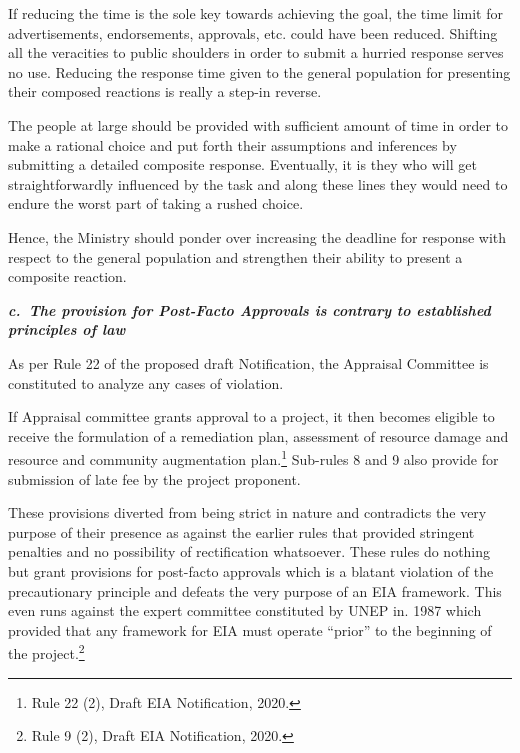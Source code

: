 \begin{multicols}{2}
\vspace{-.05cm}

\noi
If reducing the time is the sole key towards achieving the goal, the time limit for
advertisements, endorsements, approvals, etc. could have been reduced. Shifting all the
veracities to public shoulders in order to submit a hurried response serves no use.
Reducing the response time given to the general population for presenting their composed
reactions is really a step-in reverse. 

\vspace{-.05cm}

\noi
The people at large should be provided with sufficient amount of time in order to make a
rational choice and put forth their assumptions and inferences by submitting a detailed
composite response. Eventually, it is they who will get straightforwardly influenced by the
task and along these lines they would need to endure the worst part of taking a rushed choice. 

\vspace{-.05cm}

\noi
Hence, the Ministry should ponder over increasing the deadline for response with respect to
the general population and strengthen their ability to present a composite reaction. 

\vspace{-.02cm}

\noi
{\large\it\bfseries c.~The provision for Post-Facto Approvals is contrary to established principles of law}

\vspace{-.05cm}

\noi
As per Rule 22 of the proposed draft Notification, the Appraisal Committee is constituted to
analyze any cases of violation. 

\vspace{-.05cm}

\noi
If Appraisal committee grants approval to a project, it then becomes eligible to receive the
formulation of a remediation plan, assessment of resource damage and resource and
community augmentation plan.\footnote{Rule 22 (2), Draft EIA Notification, 2020.} Sub-rules 8 and 9 also provide for submission of late fee by
the project proponent.

\vspace{-.05cm}

\noi
These provisions diverted from being strict in nature and contradicts the very purpose of their
presence as against the earlier rules that provided stringent penalties and no possibility of
rectification whatsoever. These rules do nothing but grant provisions for post-facto approvals
which is a blatant violation of the precautionary principle and defeats the very purpose of an
EIA framework. This even runs against the expert committee constituted by UNEP in. 1987
which provided that any framework for EIA must operate “prior” to the beginning of the
project.\footnote{Rule 9 (2), Draft EIA Notification, 2020.}


\end{multicols}
